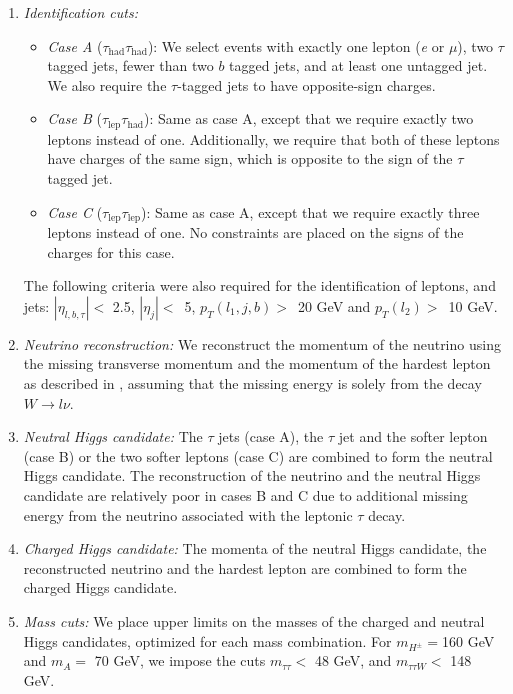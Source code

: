 \begin{enumerate}

\item \emph{Identification cuts:} 

  \begin{itemize}
    \item \emph{Case A} ($\tau_\text{had}\tau_\text{had}$): We select events with exactly one lepton (\emph{e} or $\mu$), two $\tau$ tagged jets, fewer than two $b$ tagged jets, and at least one untagged jet. We also require the $\tau$-tagged jets to have opposite-sign charges.

\item \emph{Case B} ($\tau_\text{lep}\tau_\text{had}$): Same as case A, except that we require exactly two leptons instead of one. Additionally, we require that both of these leptons have charges of the same sign, which is opposite to the sign of the $\tau$ tagged jet.
\item \emph{Case C} ($\tau_\text{lep}\tau_\text{lep}$): Same as case A, except that we require exactly three leptons instead of one. No constraints are placed on the signs of the charges for this case.
\end{itemize}
The following criteria were also required for the identification of leptons, and jets: $|\eta_{l,b,\tau}| <$ 2.5, $|\eta_{j}| <$~5, $p_{T}(l_1, j, b) >$~20 GeV and $p_{T}(l_{2}) >$~10 GeV.

\item \emph{Neutrino reconstruction:} 
We reconstruct the momentum of the neutrino using the missing transverse momentum and the momentum of the hardest lepton as described in \cite{Aad:2012ux}, assuming that the missing energy is solely from the decay $W\rightarrow l \nu$.

\item \emph{Neutral Higgs candidate:} The $\tau$ jets (case A), the $\tau$ jet and the softer lepton (case B) or the two softer leptons (case C) are combined to form the neutral Higgs candidate. The reconstruction of the neutrino and the neutral Higgs candidate are relatively poor in cases B and C due to additional missing energy from the neutrino associated with the leptonic $\tau$ decay. 

\item \emph{Charged Higgs candidate:} The momenta of the neutral Higgs candidate, the reconstructed neutrino and the hardest lepton are combined to form the charged Higgs candidate. 

\item \emph{Mass cuts:} We place upper limits on the masses of the charged and neutral Higgs candidates, optimized for each mass combination. For $m_{H^{\pm}}=$160 GeV and $m_{A}=$ 70 GeV, we impose the cuts $m_{\tau\tau} <$ 48 GeV, and $m_{\tau\tau W} <$ 148 GeV.


\end{enumerate}
